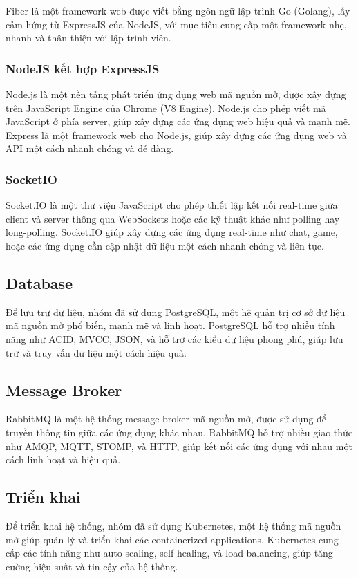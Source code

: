 \noindent Fiber là một framework web được viết bằng ngôn ngữ lập trình Go (Golang), lấy cảm hứng từ ExpressJS của NodeJS, với mục tiêu cung cấp một framework nhẹ, nhanh và thân thiện với lập trình viên.
\subsubsection{NodeJS kết hợp ExpressJS} 
\noindent Node.js là một nền tảng phát triển ứng dụng web mã nguồn mở, được xây dựng trên JavaScript Engine của Chrome (V8 Engine). Node.js cho phép viết mã JavaScript ở phía server, giúp xây dựng các ứng dụng web hiệu quả và mạnh mẽ. \\[0.5cm]
\noindent Express là một framework web cho Node.js, giúp xây dựng các ứng dụng web và API một cách nhanh chóng và dễ dàng.
\subsubsection{SocketIO}
\noindent Socket.IO là một thư viện JavaScript cho phép thiết lập kết nối real-time giữa client và server thông qua WebSockets hoặc các kỹ thuật khác như polling hay long-polling. Socket.IO giúp xây dựng các ứng dụng real-time như chat, game, hoặc các ứng dụng cần cập nhật dữ liệu một cách nhanh chóng và liên tục.

\subsection{Database}
\noindent Để lưu trữ dữ liệu, nhóm đã sử dụng PostgreSQL, một hệ quản trị cơ sở dữ liệu mã nguồn mở phổ biến, mạnh mẽ và linh hoạt. PostgreSQL hỗ trợ nhiều tính năng như ACID, MVCC, JSON, và hỗ trợ các kiểu dữ liệu phong phú, giúp lưu trữ và truy vấn dữ liệu một cách hiệu quả.

\subsection{Message Broker}
\noindent RabbitMQ là một hệ thống message broker mã nguồn mở, được sử dụng để truyền thông tin giữa các ứng dụng khác nhau. RabbitMQ hỗ trợ nhiều giao thức như AMQP, MQTT, STOMP, và HTTP, giúp kết nối các ứng dụng với nhau một cách linh hoạt và hiệu quả.

\subsection{Triển khai}
\noindent Để triển khai hệ thống, nhóm đã sử dụng Kubernetes, một hệ thống mã nguồn mở giúp quản lý và triển khai các containerized applications. Kubernetes cung cấp các tính năng như auto-scaling, self-healing, và load balancing, giúp tăng cường hiệu suất và tin cậy của hệ thống.
